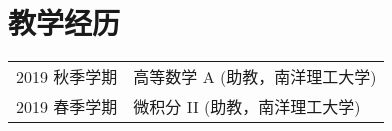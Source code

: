 \section{教学经历}

\begin{tabular}{p{} p{}}
2019 秋季学期 & 高等数学 A (助教，南洋理工大学) \\
2019 春季学期 & 微积分 II (助教，南洋理工大学)
\end{tabular}
